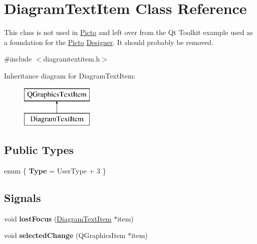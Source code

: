 \hypertarget{class_diagram_text_item}{\section{Diagram\-Text\-Item Class Reference}
\label{class_diagram_text_item}
}


This class is not used in \hyperlink{namespace_picto}{Picto} and left over from the Qt Toolkit example used as a foundation for the \hyperlink{namespace_picto}{Picto} \hyperlink{class_designer}{Designer}. It should probably be removed.  




{\ttfamily \#include $<$diagramtextitem.\-h$>$}

Inheritance diagram for Diagram\-Text\-Item\-:\begin{figure}[H]
\begin{center}
\leavevmode
\includegraphics[height=2.000000cm]{class_diagram_text_item}
\end{center}
\end{figure}
\subsection*{Public Types}
\begin{DoxyCompactItemize}
\item 
enum \{ {\bfseries Type} = User\-Type + 3
 \}
\end{DoxyCompactItemize}
\subsection*{Signals}
\begin{DoxyCompactItemize}
\item 
\hypertarget{class_diagram_text_item_a22d1bf8a5b6293a3eec6417bc34605ad}{void {\bfseries lost\-Focus} (\hyperlink{class_diagram_text_item}{Diagram\-Text\-Item} $\ast$item)}\label{class_diagram_text_item_a22d1bf8a5b6293a3eec6417bc34605ad}

\item 
\hypertarget{class_diagram_text_item_a6c50a579b220b99122a1c295ef35deb0}{void {\bfseries selected\-Change} (Q\-Graphics\-Item $\ast$item)}\label{class_diagram_text_item_a6c50a579b220b99122a1c295ef35deb0}

\end{DoxyCompactItemize}
